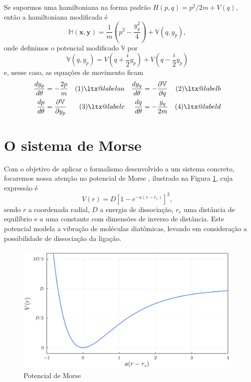 \documentclass[
	12pt,
	oneside,			%
	a4paper,			%
	english,			%
	brazil				%
	]{abntex2}
\makeatletter
\theoremstyle{definition}
\newcommand\Label[1]{&\refstepcounter{equation}(\theequation)\ltx@label{#1}&}
\makeatother
\begin{document}
Se supormos uma hamiltoniana na forma padrão $H(p,q) = p^2/2m + V(q)$, então a hamiltoniana modificada é
\begin{equation}
    \mathbb{H}(\mathbf{x},\mathbf{y}) = \frac{1}{m}\left(p^2-\frac{y_q^2}{4}\right) + \mathbb{V}(q,y_p),
\end{equation}
onde definimos o potencial modificado $\mathbb{V}$ por
\begin{equation}
\label{potencial duplo}
    \mathbb{V}(q,y_p) = V\left(q + \frac{i}{2}y_p\right) + V\left(q - \frac{i}{2}y_p\right)
\end{equation}
e, nesse caso, as equações de movimento ficam
\begin{align*}
    \frac{d y_p}{d \theta} &= - \frac{2p}{m} \Label{aa}&  \frac{d y_q}{d \theta} &= - \frac{\partial \mathbb{V}}{\partial q} \Label{b}\\
    \frac{d p}{d \theta}  &=  \frac{\partial \mathbb{V}}{\partial y_p} \Label{c} & \frac{d q}{d \theta} &= - \frac{y_q}{2m} \Label{d}
\end{align*}

\section{O sistema de Morse}

Com o objetivo de aplicar o formalismo desenvolvido a um sistema concreto, focaremos nossa atenção no potencial de Morse \cite{morse1929diatomic}, ilustrado na Figura \ref{plot potencial morse}, cuja expressão é
\begin{equation}
    V(r) = D \left[ 1-e^{-a(r-r_e)} \right]^2,
\end{equation}
sendo $r$ a coordenada radial, $D$ a energia de dissociação, $r_e$ uma distância de equilíbrio e $a$ uma constante com dimensões de inverso de distância. Este potencial modela a vibração de moléculas diatômicas, levando em consideração a possibilidade de dissociação da ligação.

\begin{figure}[H]
    \includegraphics[width=.8\textwidth]{Imagens/plot_morse.png}
    \centering
    \caption{Potencial de Morse}
    \label{plot potencial morse}
\end{figure}
\end{document}
